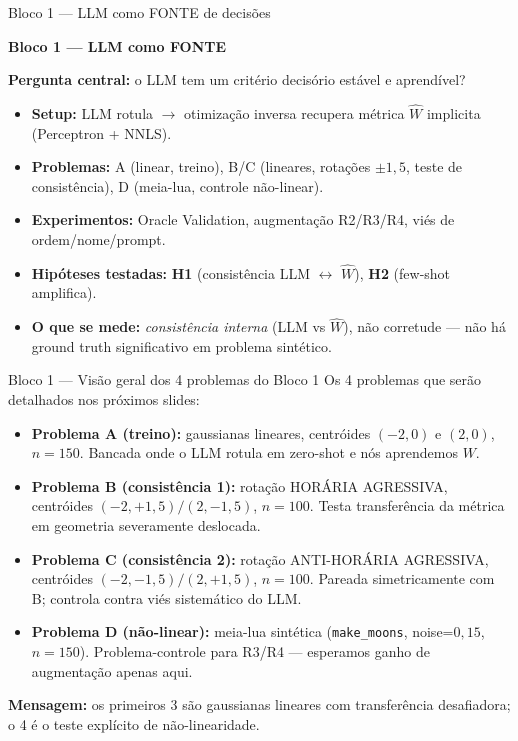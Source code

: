 \documentclass[aspectratio=169,10pt]{beamer}
\begin{document}

\begin{frame}{Bloco 1 --- LLM como FONTE de decis\~oes}
  \footnotesize
  \begin{center}\Large\textbf{Bloco 1 --- LLM como FONTE}\end{center}
  \medskip
  \textbf{Pergunta central:} o LLM tem um crit\'erio decis\'orio est\'avel e aprend\'ivel?
  \medskip
  \begin{itemize}\setlength\itemsep{0.1em}
    \item \textbf{Setup:} LLM rotula $\rightarrow$ otimiza\c{c}\~ao inversa recupera m\'etrica $\hat W$ implicita (Perceptron + NNLS).
    \item \textbf{Problemas:} A (linear, treino), B/C (lineares, rota\c{c}\~oes $\pm 1{,}5$, teste de consist\^encia), D (meia-lua, controle n\~ao-linear).
    \item \textbf{Experimentos:} Oracle Validation, augmenta\c{c}\~ao R2/R3/R4, vi\'es de ordem/nome/prompt.
    \item \textbf{Hip\'oteses testadas:} \textbf{H1} (consist\^encia LLM $\leftrightarrow$ $\hat W$), \textbf{H2} (few-shot amplifica).
    \item \textbf{O que se mede:} \emph{consist\^encia interna} (LLM vs $\hat W$), n\~ao corretude --- n\~ao h\'a ground truth significativo em problema sint\'etico.
  \end{itemize}
\end{frame}

\begin{frame}{Bloco 1 --- Vis\~ao geral dos 4 problemas do Bloco 1}
  \footnotesize
  Os 4 problemas que ser\~ao detalhados nos pr\'oximos slides:
  \medskip
  \begin{itemize}\setlength\itemsep{0.45em}
    \item \textbf{Problema A (treino):} gaussianas lineares, centr\'oides $(-2, 0)$ e $(2, 0)$, $n=150$. Bancada onde o LLM rotula em zero-shot e n\'os aprendemos $W$.
    \item \textbf{Problema B (consist\^encia 1):} rota\c{c}\~ao HOR\'ARIA AGRESSIVA, centr\'oides $(-2, +1{,}5)/(2, -1{,}5)$, $n=100$. Testa transfer\^encia da m\'etrica em geometria severamente deslocada.
    \item \textbf{Problema C (consist\^encia 2):} rota\c{c}\~ao ANTI-HOR\'ARIA AGRESSIVA, centr\'oides $(-2, -1{,}5)/(2, +1{,}5)$, $n=100$. Pareada simetricamente com B; controla contra vi\'es sistem\'atico do LLM.
    \item \textbf{Problema D (n\~ao-linear):} meia-lua sint\'etica (\texttt{make\_moons}, noise=$0{,}15$, $n=150$). Problema-controle para R3/R4 --- esperamos ganho de augmenta\c{c}\~ao apenas aqui.
  \end{itemize}
  \medskip
  \textbf{Mensagem:} os primeiros 3 s\~ao gaussianas lineares com transfer\^encia desafiadora; o 4\textordmasculine{} \'e o teste expl\'icito de n\~ao-linearidade.
\end{frame}
\end{document}
